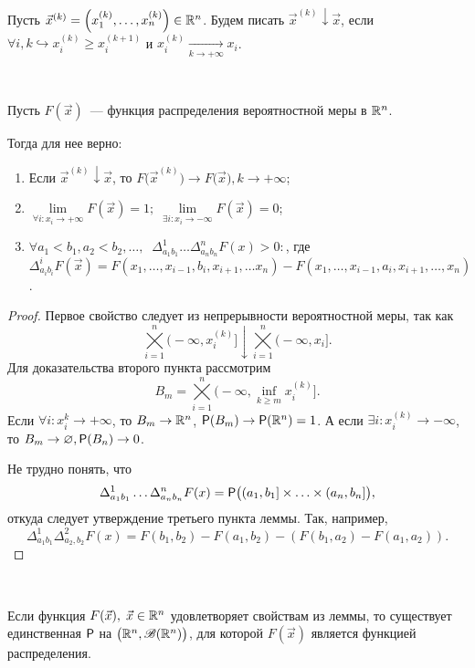 \begin{note}
	Пусть $\vec x^{(k)} = \left(x_1^{(k)}, \ldots, x_n^{(k)}\right) \in \R^n$. Будем писать $\vec x^{(k)} \downarrow \vec x$, если $\forall i, k \hookrightarrow x_i^{(k)} \geqslant x_i^{(k + 1)}$ и $x_i^{(k)} \underset{k \rightarrow +\infty}{\longrightarrow} x_i$.
\end{note}

\begin{lemma}~

	Пусть $F(\vec x)$~--- функция распределения вероятностной меры в $\R^n$.
	
	Тогда для нее верно:
	\begin{enumerate}
		\item Если $\vec x^{(k)} \downarrow \vec x$, то $F\big(\vec x^{(k)}\big) \rightarrow F\big(\vec x\big), k \rightarrow +\infty$;
		\item $\lim\limits_{\forall i : x_i \rightarrow +\infty} F(\vec x) = 1;\; \lim\limits_{\exists i : x_i \rightarrow -\infty} F(\vec x) = 0$;
		\item $\forall a_1 < b_1, a_2 < b_2, \ldots,\;\; \Delta_{a_1b_1}^1 \ldots \Delta_{a_nb_n}^nF(x) > 0 :$, где \\
		$\Delta_{a_ib_i}^i F(\vec x) = F(x_1, \ldots, x_{i - 1}, b_i, x_{i + 1}, \ldots x_n) - F(x_1, \ldots, x_{i - 1}, a_i, x_{i + 1}, \ldots, x_n)$.
	\end{enumerate}
	\begin{proof}
		Первое свойство следует из непрерывности вероятностной меры, так как $$\bigtimes\limits_{i = 1}^n\big(-\infty, x_i^{(k)}\big] \downarrow \bigtimes\limits_{i = 1}^n \big(-\infty, x_i\big].$$
		Для доказательства второго пункта рассмотрим
		$$B_m = \bigtimes\limits_{i = 1}^n\big(-\infty, \inf\limits_{k \geqslant m} x_i^{(k)}\big].$$
		Если $\forall i : x_i^k \rightarrow +\infty$, то $B_m \rightarrow \R^n$, $\P(B_m) \rightarrow \P(\R^n) = 1$. А если $\exists i : x_i^{(k)} \rightarrow - \infty$, то $B_m \rightarrow \varnothing, \P(B_n) \rightarrow 0$.
		
		Не трудно понять, что 
		$$\Delta_{a_1b_1}^1 \ldots \Delta_{a_nb_n}^nF(x) = \P\big((a_1, b_1] \times \ldots \times (a_n, b_n]\big),$$
		откуда следует утверждение третьего пункта леммы. Так, например,
		$$\Delta_{a_1b_1}^1\Delta_{a_2,b_2}^2F(x) = F(b_1,b_2) - F(a_1,b_2) - (F(b_1,a_2) - F(a_1,a_2)).$$
	\end{proof}
\end{lemma}

\begin{theorem}~

	Если функция $F(\vec x),\; \vec x \in \R^n$ удовлетворяет свойствам из леммы, то существует единственная $\P$ на $\big(\R^n, \B(\R^n) \big)$, для которой $F(\vec x)$ является функцией распределения.
\end{theorem}

